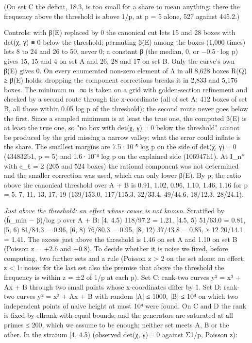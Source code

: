 \documentclass[11pt,a4paper]{article}
\theoremstyle{named}
\begin{document}
(On set C the deficit, 18.3, is too small for a share to mean anything: there the frequency above the threshold is above 1/p, at p = 5 alone, 527 against 445.2.)

Controls: with β(E) replaced by 0 the canonical cut lets 15 and 28 boxes with det(χ, γ) ≡ 0 below the threshold; permuting β(E) among the boxes (1,000 times) lets 8 to 24 and 26 to 50, never 0; a constant β (the median, 0, or −0.5·log p) gives 15, 15 and 4 on set A and 26, 28 and 17 on set B. Only the curve's own β(E) gives 0. On every enumerated non-zero element of Λ in all 8,628 boxes R(Q) ≥ β(E) holds; dropping the component corrections breaks it in 2,833 and 5,176 boxes. The minimum m\_∞ is taken on a grid with golden-section refinement and checked by a second route through the x-coordinate (all of set A; 412 boxes of set B, all those within 0.05 log p of the threshold): the second route never goes below the first. Since a sampled minimum is at least the true one, the computed β(E) is at least the true one, so "no box with det(χ, γ) ≡ 0 below the threshold" cannot be produced by the grid missing a narrow valley; what the error could inflate is the share. The smallest margins are 7.5·10⁻⁵ log p on the side of det(χ, γ) ≡ 0 (434832b1, p = 5) and 1.6·10⁻⁴ log p on the explained side (106947h1). At I\_n* with c\_ℓ = 2 (205 and 524 boxes) the rational component was not determined and the smaller correction was used, which can only lower β(E). By p, the ratio above the canonical threshold over A + B is 0.91, 1.02, 0.96, 1.10, 1.46, 1.16 for p = 5, 7, 11, 13, 17, 19 (139/153.0, 117/115.3, 32/33.4, 49/44.6, 18/12.3, 28/24.1).

\textit{Just above the threshold: an effect whose cause is not known.} Stratified by (ĥ\_min − β)/log p over A + B: [4, 4.5) 118/97.2 = 1.21, [4.5, 5) 51/63.0 = 0.81, [5, 6) 81/84.3 = 0.96, [6, 8) 76/80.3 = 0.95, [8, 12) 37/43.8 = 0.85, ≥ 12 20/14.1 = 1.41. The excess just above the threshold is 1.46 on set A and 1.10 on set B (Poisson z = +2.6 and +0.8). To decide whether it is noise we fixed, before computing, two further sets and a rule (Poisson z \textgreater{} 2 on the set alone: an effect; z \textless{} 1: noise; for the last set also the premise that above the threshold the frequency is within z = ±2 of 1/p at each p). Set C: rank-two curves y² = x³ + Ax + B through two small points whose x-coordinates differ by 1. Set D: rank-two curves y² = x³ + Ax + B with random |A| ≤ 1000, |B| ≤ 10⁴ on which two independent points of naive height at most 10⁴ were found. On C and D the rank is fixed by ellrank with equal bounds, and the generators are saturated at all primes ≤ 200, which we assume to be enough; neither set meets A, B or the other. In the stratum [4, 4.5) (observed det(χ, γ) ≡ 0 against Σ1/p, Poisson z):
\end{document}
